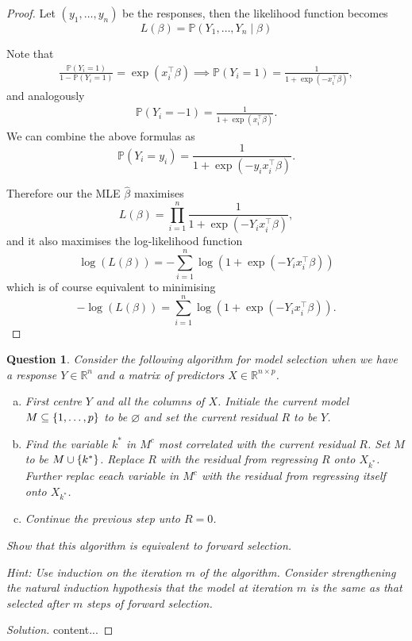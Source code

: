 \documentclass{article}
\theoremstyle{plain}
\newtheorem{question}{Question}
\theoremstyle{remark}
\newenvironment{solution}{\begin{proof}[Solution]\renewcommand\qedsymbol{}}{\end{proof}}
\renewcommand{\emptyset}{\varnothing}
\newcommand{\Bb}{\mathbb}
\newcommand{\PP}{\Bb P}
\newcommand{\RR}{\Bb R}
\newcommand{\T}{^\top} %
\begin{document}
\begin{proof}
	Let $(y_1, \dotsc, y_n)$ be the responses, then the likelihood function becomes
	\[
	L(\beta) = \PP(Y_1, \dotsc, Y_n \mid \beta)
	\]
	
	Note that
	\begin{align*}
		\frac{\PP(Y_i = 1)}{1 - \PP(Y_i = 1)} = \exp(x_i\T\beta) \implies \PP(Y_i = 1) = \frac{1}{1 + \exp(-x_i\T \beta)},
	\end{align*}
and analogously
\begin{align*}
	\PP(Y_i = -1) =  \frac{1}{1 + \exp(x_i\T\beta)}. 
\end{align*}
We can combine the above formulas as
\[
\PP(Y_i = y_i) = \frac{1}{1 + \exp(-y_i x_i\T\beta)}. 
\]

Therefore our the MLE $\hat\beta$ maximises
\[
L(\beta) = \prod_{i=1}^n \frac{1}{1 + \exp(-Y_i x_i\T\beta)}, 
\]
and it also maximises the log-likelihood function
\[
\log(L(\beta)) = - \sum_{i=1}^n \log(1 + \exp(-Y_i x_i\T\beta))
\]
which is of course equivalent to minimising
\[
-\log(L(\beta)) = \sum_{i=1}^n \log(1 + \exp(-Y_i x_i\T\beta)). 
\]
\end{proof}

\begin{question}
	Consider the following algorithm for model selection when we have a response $Y \in \RR^n$ and a matrix of predictors $X \in \RR^{n \times p}$.
	\begin{enumerate}[(a)]
		\item First centre $Y$ and all the columns of $X$. Initiale the current model $M \subseteq \qty{1, \dotsc, p}$ to be $\emptyset$ and set the current residual $R$ to be $Y$. 
		\item Find the variable $k^*$ in $M^c$ most correlated with the current residual $R$. Set $M$ to be $M \cup \qty{k^*}$. Replace $R$ with the residual from regressing $R$ onto $X_{k^*}$. Further replac eeach variable in $M^c$ with the residual from regressing itself onto $X_{k^*}$.
		\item Continue the previous step unto $R = 0$. 
	\end{enumerate}
Show that this algorithm is equivalent to forward selection.

\emph{Hint:} Use induction on the iteration $m$ of the algorithm. Consider strengthening the natural induction hypothesis that the model at iteration $m$ is the same as that selected after $m$ steps of forward selection. 
\end{question}

\begin{solution}
	content...
\end{solution}
\end{document}

